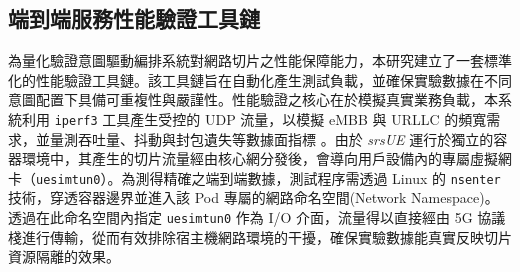 \subsection{端到端服務性能驗證工具鏈}
\label{subsec:validation_toolchain}

為量化驗證意圖驅動編排系統對網路切片之性能保障能力，本研究建立了一套標準化的性能驗證工具鏈。該工具鏈旨在自動化產生測試負載，並確保實驗數據在不同意圖配置下具備可重複性與嚴謹性。性能驗證之核心在於模擬真實業務負載，本系統利用 \texttt{iperf3} 工具產生受控的 UDP 流量，以模擬 eMBB 與 URLLC 的頻寬需求，並量測吞吐量、抖動與封包遺失等數據面指標 \cite{iperf3_manual}。由於 \textit{srsUE} 運行於獨立的容器環境中，其產生的切片流量經由核心網分發後，會導向用戶設備內的專屬虛擬網卡（\texttt{uesimtun0}）。為測得精確之端到端數據，測試程序需透過 Linux 的 \texttt{nsenter} 技術，穿透容器邊界並進入該 Pod 專屬的網路命名空間(Network Namespace)。透過在此命名空間內指定 \texttt{uesimtun0} 作為 I/O 介面，流量得以直接經由 5G 協議棧進行傳輸，從而有效排除宿主機網路環境的干擾，確保實驗數據能真實反映切片資源隔離的效果。
